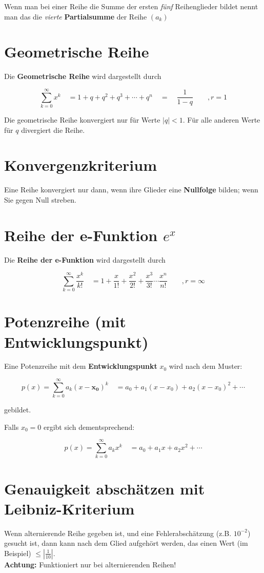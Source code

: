 \documentclass[12pt, a4paper]{scrreprt}
\begin{document}
Wenn man bei einer Reihe die Summe der ersten \textit{fünf} Reihenglieder bildet nennt man das die \textit{vierte} \textbf{Partialsumme} der Reihe \((a_k)\)

\section{Geometrische Reihe}

Die \textbf{Geometrische Reihe} wird dargestellt durch

\[
  \sum_{k=0}^{\infty} x^k \quad = 1+q+q^2+q^3+ \cdots +q^n \quad = \quad \frac{1}{1-q} \qquad , r = 1
\]

Die geometrische Reihe konvergiert nur für Werte \(|q| < 1\). Für alle anderen Werte für \(q\) divergiert die Reihe.

\section{Konvergenzkriterium}

Eine Reihe konvergiert nur dann, wenn ihre Glieder eine \textbf{Nullfolge} bilden; wenn Sie gegen Null streben.

\section{Reihe der e-Funktion \(e^x\)}

Die \textbf{Reihe der e-Funktion} wird dargestellt durch

\[
  \sum_{k=0}^{\infty}\frac{x^k}{k!} \quad = 1 + \frac{x}{1!} + \frac{x^2}{2!} + \frac{x^3}{3!} \cdots \frac{x^n}{n!} \qquad , r = \infty
\]

\section{Potenzreihe (mit Entwicklungspunkt)}

Eine Potenzreihe mit dem \textbf{Entwicklungspunkt} \(x_0\) wird nach dem Muster:

\[
  p(x) = \sum_{k=0}^{\infty} a_k(x- \mathbf{x_0} )^k \quad = a_0 + a_1(x-x_0) + a_2(x-x_0)^2 + \cdots
\]

gebildet.

Falls \(x_0=0\) ergibt sich dementsprechend:

\[
  p(x) = \sum_{k=0}^{\infty} a_k x^k \quad = a_0 + a_1x + a_2x^2 + \cdots
\]

\section{Genauigkeit abschätzen mit Leibniz-Kriterium}
Wenn alternierende Reihe gegeben ist, und eine Fehlerabschätzung (z.B. \(10^{-2}\)) gesucht ist, dann kann nach dem Glied aufgehört werden, das einen Wert (im Beispiel) \(\leq \left| \frac{1}{10} \right|\).\\
\textbf{Achtung: }Funktioniert nur bei alternierenden Reihen!
\end{document}
